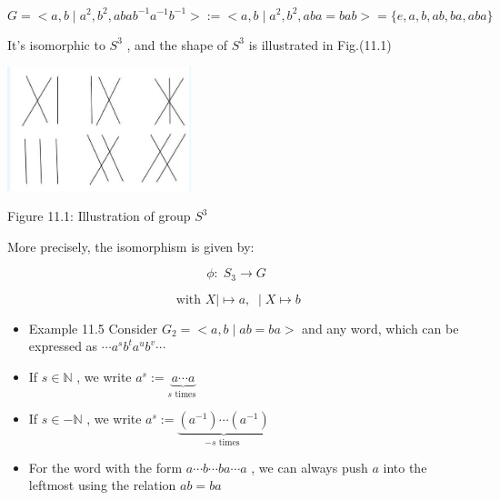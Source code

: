 \[
G =  < a,b \mid  {a}^{2},{b}^{2},{aba}{b}^{-1}{a}^{-1}{b}^{-1} >  \mathrel{\text{ := }}  < a,b \mid  {a}^{2},{b}^{2},{aba} = {bab} >  = \{ e,a,b,{ab},{ba},{aba}\}
\]

It’s isomorphic to \({S}^{3}\) , and the shape of \({S}^{3}\) is illustrated in Fig.(11.1)

\begin{center}
\includegraphics[max width=0.4\textwidth]{images/bo_d2bcsrref24c73avs720_107_737_1365_483_327_0.jpg}
\end{center}
\hspace*{3em} 

Figure 11.1: Illustration of group \({S}^{3}\)

More precisely, the isomorphism is given by:

\[
\phi  : \;{S}_{3} \rightarrow  G
\]

\[
\text{ with }X \mid   \mapsto  a,\; \mid  X \mapsto  b
\]

\begin{itemize}
\item Example 11.5 Consider \({G}_{2} =  < a,b \mid  {ab} = {ba} >\) and any word, which can be expressed as \(\cdots {a}^{s}{b}^{t}{a}^{u}{b}^{v}\cdots\)
\end{itemize}

\begin{itemize}
\item If \(s \in  \mathbb{N}\) , we write \({a}^{s} \mathrel{\text{ := }} \underset{s\text{ times }}{\underbrace{a\cdots a}}\)
\end{itemize}

\begin{itemize}
\item If \(s \in   - \mathbb{N}\) , we write \({a}^{s} \mathrel{\text{ := }} \underset{-s\text{ times }}{\underbrace{\left( {a}^{-1}\right) \cdots \left( {a}^{-1}\right) }}\)
\end{itemize}

\begin{itemize}
\item For the word with the form \(a\cdots b\cdots {ba}\cdots a\) , we can always push \(a\) into the leftmost using the relation \({ab} = {ba}\)
\end{itemize}


